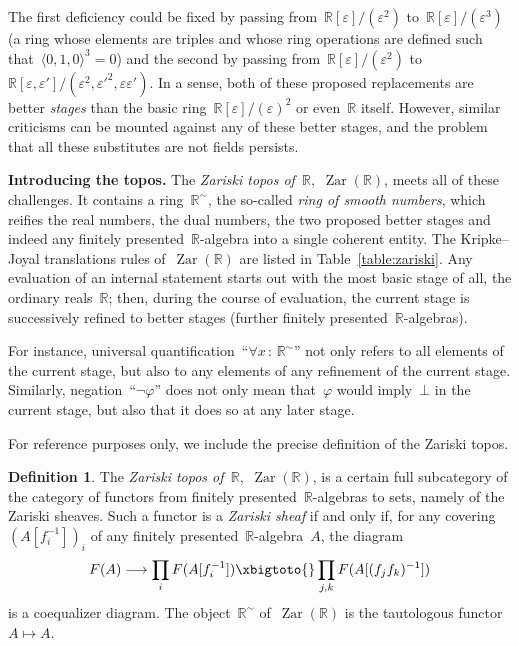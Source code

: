\documentclass[oneside,reqno]{amsart}
\theoremstyle{definition}
\newtheorem{defn}{Definition}[section]
\theoremstyle{plain}
\theoremstyle{remark}
\newcommand{\RR}{\mathbb{R}}
\DeclareMathOperator{\Zar}{Zar}
\renewcommand{\_}{\mathpunct{.}\,}
\newcommand{\?}{\,{:}\,}
\renewcommand{\paragraph}[1]{\noindent\textbf{#1.}}
\begin{document}
The first deficiency could be fixed by passing
from~$\RR[\varepsilon]/(\varepsilon^2)$ to~$\RR[\varepsilon]/(\varepsilon^3)$
(a ring whose elements are triples and whose ring operations are defined such
that~$\langle0,1,0\rangle^3 = 0$) and the second by passing
from~$\RR[\varepsilon]/(\varepsilon^2)$
to~$\RR[\varepsilon,\varepsilon']/(\varepsilon^2,\varepsilon'^2,\varepsilon\varepsilon')$.
In a sense, both of these proposed replacements are better \emph{stages} than
the basic ring~$\RR[\varepsilon]/(\varepsilon)^2$ or even~$\RR$ itself. However,
similar criticisms can be mounted against any of these better stages, and the
problem that all these substitutes are not fields persists.

\bigskip
\paragraph{Introducing the topos}
The \emph{Zariski topos of~$\RR$},~$\Zar(\RR)$, meets all of these challenges. It
contains a ring~$\RR^\sim$, the so-called \emph{ring of smooth numbers}, which reifies
the real numbers, the dual numbers, the two proposed better stages and indeed
any finitely presented~$\RR$-algebra into a single coherent entity. The
Kripke--Joyal translations rules of~$\Zar(\RR)$ are listed in
Table~\ref{table:zariski}. Any evaluation of an internal statement starts out
with the most basic stage of all, the ordinary reals~$\RR$; then, during the
course of evaluation, the current stage is successively refined to better
stages (further finitely presented~$\RR$-algebras).

For instance, universal quantification~``$\forall x \? \RR^\sim$'' not only refers to
all elements of the current stage, but also to any elements of any refinement
of the current stage. Similarly, negation~``$\neg\varphi$'' does not only mean
that~$\varphi$ would imply~$\bot$ in the current stage, but also that it does
so at any later stage.

For reference purposes only, we include the precise definition of the Zariski topos.
\begin{defn}The \emph{Zariski topos of~$\RR$},~$\Zar(\RR)$, is a certain full subcategory of
the category of functors from finitely presented~$\RR$-algebras to sets, namely of
the Zariski sheaves. Such a functor is a \emph{Zariski sheaf} if and only if,
for any covering~$(A[f_i^{-1}])_i$ of any finitely presented~$\RR$-algebra~$A$,
the diagram
\[ F(A) \longrightarrow \prod_i F(A[f_i^{-1}]) \xbigtoto{} \prod_{j,k}
F(A[(f_jf_k)^{-1}]) \]
is a coequalizer diagram. The object~$\RR^\sim$ of~$\Zar(\RR)$ is the tautologous functor~$A \mapsto A$.
\end{defn}
\end{document}
